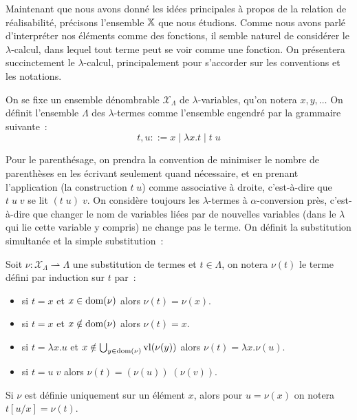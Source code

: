 \documentclass{article}
\begin{document}
Maintenant que nous avons donné les idées principales à propos de la relation de réalisabilité, précisons l'ensemble $\mathbb X$ que nous étudions. Comme nous avons parlé d'interpréter nos éléments comme des fonctions, il semble naturel de considérer le $\lambda$-calcul, dans lequel tout terme peut se voir comme une fonction. On présentera succinctement le $\lambda$-calcul, principalement pour s'accorder sur les conventions et les notations.

\begin{defi}\label{def.lam}
    On se fixe un ensemble dénombrable $\mathcal X_\Lambda$ de $\lambda$-variables, qu'on notera $x,y,\ldots$ On définit l'ensemble $\Lambda$ des $\lambda$-termes comme l'ensemble engendré par la grammaire suivante~:
    \[t,u ::= x \mid \lambda x. t\mid t\;u\]
\end{defi}

Pour le parenthésage, on prendra la convention de minimiser le nombre de parenthèses en les écrivant seulement quand nécessaire, et en prenant l'application (la construction $t\;u$) comme associative à droite, c'est-à-dire que $t\;u\;v$ se lit $(t\;u)\;v$. On considère toujours les $\lambda$-termes à $\alpha$-conversion près, c'est-à-dire que changer le nom de variables liées par de nouvelles variables (dans le $\lambda$ qui lie cette variable y compris) ne change pas le terme. On définit la substitution simultanée et la simple substitution~:

\begin{defi}
    Soit $\nu : \mathcal X_\Lambda \rightharpoonup \Lambda$ une substitution de termes et $t\in \Lambda$, on notera $\nu(t)$ le terme défini par induction sur $t$ par~:
\begin{itemize}
        \item si $t = x$ et $x \in \mathrm{dom}(\nu)$ alors $\nu(t) = \nu(x)$.
        \item si $t = x$ et $x\notin\mathrm{dom}(\nu)$ alors $\nu(t) = x$.
        \item si $t = \lambda x.u$ et $x\notin\bigcup_{y\in\mathrm{dom}(\nu)}\mathrm{vl}(\nu(y))$ alors $\nu(t) = \lambda x.\nu(u)$.
        \item si $t = u\;v$ alors $\nu(t) = (\nu(u))\;(\nu(v))$.
    \end{itemize}

    Si $\nu$ est définie uniquement sur un élément $x$, alors pour $u = \nu(x)$ on notera $t[u/x] = \nu(t)$.
\end{defi}
\end{document}
